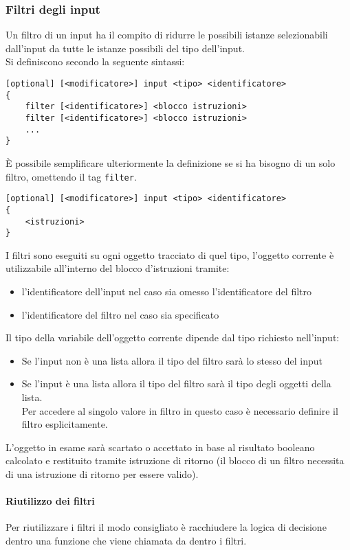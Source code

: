 \subsubsection{Filtri degli input}
Un filtro di un input ha il compito di ridurre le possibili istanze selezionabili dall'input da tutte
le istanze possibili del tipo dell'input. \\
Si definiscono secondo la seguente sintassi:
\begin{lstlisting}
[optional] [<modificatore>] input <tipo> <identificatore> 
{
    filter [<identificatore>] <blocco istruzioni>
    filter [<identificatore>] <blocco istruzioni>
    ...
}
\end{lstlisting}
È possibile semplificare ulteriormente la definizione se si ha bisogno di un solo filtro, omettendo
il tag \lstinline|filter|.
\begin{lstlisting}
[optional] [<modificatore>] input <tipo> <identificatore> 
{
    <istruzioni>
}
\end{lstlisting}
I filtri sono eseguiti su ogni oggetto tracciato di quel tipo, l'oggetto corrente è utilizzabile 
all'interno del blocco d'istruzioni tramite:
\begin{itemize}
    \item l'identificatore dell'input nel caso sia omesso l'identificatore del filtro
    \item l'identificatore del filtro nel caso sia specificato
\end{itemize}
Il tipo della variabile dell'oggetto corrente dipende dal tipo richiesto nell'input:
\begin{itemize}
    \item Se l'input non è una lista allora il tipo del filtro sarà lo stesso del input 
    \item { 
        Se l'input è una lista allora il tipo del filtro sarà il tipo degli oggetti della lista. \\
        Per accedere al singolo valore in filtro in questo caso è necessario definire il filtro esplicitamente.
    }
\end{itemize} 
L'oggetto in esame sarà scartato o accettato in base al risultato booleano calcolato e restituito tramite 
istruzione di ritorno (il blocco di un filtro necessita di una istruzione di ritorno per essere valido).

\paragraph{Riutilizzo dei filtri}
Per riutilizzare i filtri il modo consigliato è racchiudere la logica di decisione dentro una funzione
che viene chiamata da dentro i filtri. 

